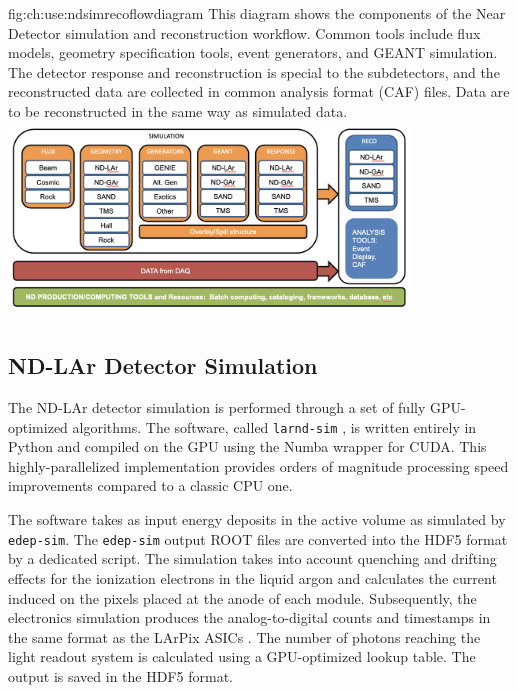 \documentclass[../main-v1.tex]{subfiles}
\begin{document}
\begin{dunefigure}
{fig:ch:use:ndsimrecoflowdiagram}
{This diagram shows the components of the Near Detector simulation and reconstruction workflow.  Common tools include flux models, geometry specification tools, event generators, and GEANT simulation.  The detector response and reconstruction is special to the subdetectors, and the reconstructed data are collected in common analysis format (CAF) files.  Data are to be reconstructed in the same way as simulated data.}
\includegraphics[width=0.8\textwidth]{graphics/Algo/ND_sim_reco_flowdiagram.png}
\end{dunefigure}

\subsection{ND-LAr Detector Simulation}
The ND-LAr detector simulation is performed through a set of fully GPU-optimized algorithms. The software, called \texttt{larnd-sim} \cite{larndsim}, is written entirely in Python and compiled on the GPU using the Numba wrapper for CUDA. This highly-parallelized implementation provides orders of magnitude processing speed improvements compared to a classic CPU one.

The software takes as input energy deposits in the active volume as simulated by \texttt{edep-sim}. The \texttt{edep-sim} output ROOT files are converted into the HDF5 format by a dedicated script. The simulation takes into account quenching and drifting effects for the ionization electrons in the liquid argon and calculates the current induced on the pixels placed at the anode of each module. Subsequently, the electronics simulation produces the analog-to-digital counts and timestamps in the same format as the LArPix ASICs \cite{larpix}. The number of photons reaching the light readout system is calculated using a GPU-optimized lookup table. The output is saved in the HDF5 format. 
\end{document}
